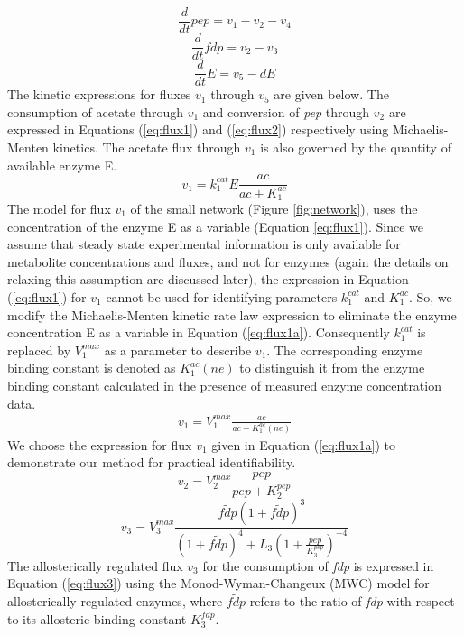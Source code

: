 \documentclass[10pt]{article}
\begin{document}
	\begin{equation}\label{eq:ode1}
	\frac{d}{dt}pep=v_1-v_2-v_4
	\end{equation}
	\begin{equation}\label{eq:ode2}
	\frac{d}{dt}fdp=v_2-v_3
	\end{equation}
	\begin{equation}\label{eq:ode3}
	\frac{d}{dt}E=v_5 - d E
	\end{equation}
	The kinetic expressions for fluxes $v_1$ through $v_5$ are given below. The consumption of acetate through $v_1$ and conversion of \textit{pep} through $v_2$ are expressed in Equations (\ref{eq:flux1}) and (\ref{eq:flux2}) respectively using Michaelis-Menten kinetics. The acetate flux through $v_1$ is also governed by the quantity of available enzyme E. 
	\begin{equation}\label{eq:flux1}
	v_1 = k_{1}^{cat}E\frac{ac}{ac+K_{1}^{ac}}
	\end{equation}		
	The model for flux $v_1$ of the small network (Figure \ref{fig:network}), uses the concentration of the enzyme E as a variable (Equation \ref{eq:flux1}). Since we assume that steady state experimental information is only available for metabolite concentrations and fluxes, and not for enzymes (again the details on relaxing this assumption are discussed later), the expression in Equation (\ref{eq:flux1}) for $v_1$ cannot be used for identifying parameters $k_1^{cat}$ and $K_1^{ac}$. So, we modify the Michaelis-Menten kinetic rate law expression to eliminate the enzyme concentration E as a variable in Equation (\ref{eq:flux1a}). Consequently $k_1^{cat}$ is replaced by $V_1^{max}$ as a parameter to describe $v_1$. The corresponding enzyme binding constant is denoted as $K_1^{ac} (ne)$ to distinguish it from the enzyme binding constant calculated in the presence of measured enzyme concentration data.
	\begin{align}\label{eq:flux1a}
	v_1 = V_1^{max}\frac{ac}{ac+K_{1}^{ac}(ne)}
	\end{align}		
	We choose the expression for flux $v_1$ given in Equation (\ref{eq:flux1a}) to demonstrate our method for practical identifiability. 	
	\begin{equation}\label{eq:flux2}
	v_2 = V_{2}^{max}\frac{pep}{pep+K_{2}^{pep}}
	\end{equation}
	\begin{equation}\label{eq:flux3}
	v_3 = V_{3}^{max}\frac{\tilde{fdp}\left(1+\tilde{fdp}\right)^3}{\left(1+\tilde{fdp}\right)^4+L_3\left(1+\frac{pep}{K_{3}^{pep}}\right)^{-4}}
	\end{equation}
	The allosterically regulated flux $v_3$ for the consumption of \textit{fdp} is expressed in Equation (\ref{eq:flux3}) using the Monod-Wyman-Changeux (MWC) model for allosterically regulated enzymes, where $\tilde{fdp}$ refers to the ratio of \textit{fdp} with respect to its allosteric binding constant $K_{3}^{fdp}$. 
	
\end{document}
